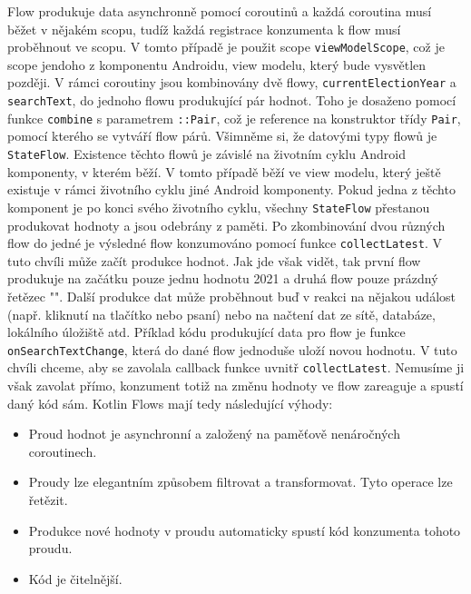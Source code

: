 \noindent Flow produkuje data asynchronně pomocí coroutinů a každá coroutina musí běžet v nějakém scopu, tudíž každá registrace konzumenta k flow musí proběhnout ve scopu. V tomto případě je použit scope \lstinline|viewModelScope|, což je scope jendoho z komponentu Androidu, view modelu, který bude vysvětlen později. V rámci coroutiny jsou kombinovány dvě flowy, \lstinline|currentElectionYear| \linebreak a \lstinline|searchText|, do jednoho flowu produkující pár hodnot. Toho je dosaženo pomocí funkce \lstinline|combine| s parametrem \lstinline|::Pair|, což je reference na konstruktor třídy \lstinline|Pair|, pomocí kterého se vytváří flow párů. Všimněme si, že datovými typy flowů je \lstinline|StateFlow|. Existence těchto flowů je závislé na životním cyklu Android komponenty, v kterém běží. V tomto případě běží ve view modelu, který ještě existuje v rámci životního cyklu jiné Android komponenty. Pokud jedna z těchto komponent je po konci svého životního cyklu, všechny \lstinline|StateFlow| přestanou produkovat hodnoty a jsou odebrány z paměti. Po zkombinování dvou různých flow do jedné je výsledné flow konzumováno pomocí funkce \lstinline|collectLatest|. V tuto chvíli může začít produkce hodnot. Jak jde však vidět, tak první flow produkuje na začátku pouze jednu hodnotu 2021 a druhá flow pouze prázdný řetězec "". Další produkce dat může proběhnout buď v reakci na nějakou událost (např. kliknutí na tlačítko nebo psaní) nebo na načtení dat ze sítě, databáze, lokálního úložiště atd. Příklad kódu produkující data pro flow je funkce \lstinline|onSearchTextChange|, která do dané flow jednoduše uloží novou hodnotu. V tuto chvíli chceme, aby se zavolala callback funkce uvnitř \lstinline|collectLatest|. Nemusíme ji však zavolat přímo, konzument totiž na změnu hodnoty ve flow zareaguje a spustí daný kód sám. Kotlin Flows mají tedy následující výhody:

\begin{itemize}
	\item Proud hodnot je asynchronní a založený na paměťově nenáročných coroutinech.
	
	\item Proudy lze elegantním způsobem filtrovat a transformovat. Tyto operace lze řetězit.
	
	\item Produkce nové hodnoty v proudu automaticky spustí kód konzumenta tohoto proudu.
	
	\item Kód je čitelnější.
\end{itemize}


